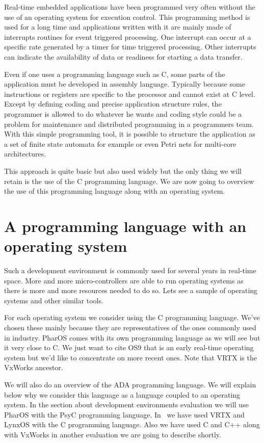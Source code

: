 \documentclass[10pt]{report}
\begin{document}
Real-time embedded applications have been programmed very often without the use of an operating system for execution
control. This programming method is used for a long time and applications written with it are mainly made of
interrupts routines for event triggered processing. One interrupt can occur at a specific rate generated by a timer
for time triggered processing. Other interrupts can indicate the availability of data or readiness for starting
a data transfer.

Even if one uses a programming language such as C, some parts of the application must be developed in assembly language.
Typically because some instructions or registers are specific to the processor and cannot exist at C level. Except by
defining coding and precise application structure rules, the programmer is allowed to do whatever he wants and coding
style could be a problem for maintenance and distributed programming in a programmers team. With this simple programming
tool, it is possible to structure the application as a set of finite state automata for example or even Petri nets
for multi-core architectures.

This approach is quite basic but also used widely but the only thing we will retain is the use of the C programming
language. We are now going to overview the use of this programming language along with an operating system.

\section{A programming language with an operating system}

Such a development environment is commonly used for several years in real-time space. More and more micro-controllers are
able to run operating systems as there is more and more resources needed to do so. Lets see a sample of operating systems
and other similar tools.

For each operating system we consider using the C programming language. We've chosen these mainly because they are
representatives of the ones commonly used in industry. PharOS comes with its own programming language as we will see but
it very close to C. We just want to cite OS9 that is an early real-time operating system but we'd like to concentrate
on more recent ones. Note that VRTX is the VxWorks ancestor.

We will also do an overview of the ADA programming language. We will explain below why we consider this language as
a language coupled to an operating system. In the section about development environments evaluation we will use
PharOS with the PsyC programming language. In~\cite{Delchini:95} we have used VRTX and LynxOS with the C programming
language. Also we have used C and C++ along with VxWorks in another evaluation we are going to describe shortly.
\end{document}
